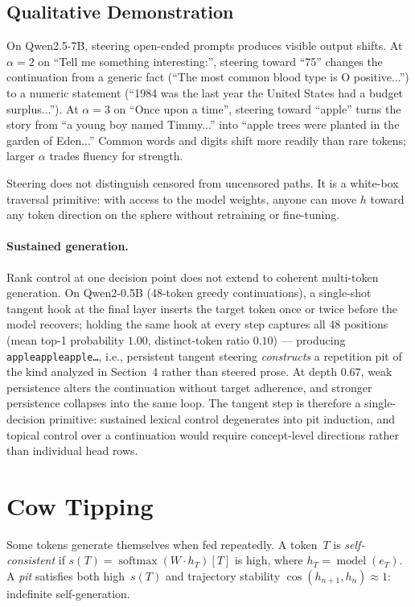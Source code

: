 \documentclass{article}
\begin{document}
\subsection{Qualitative Demonstration}

On Qwen2.5-7B, steering open-ended prompts produces visible output shifts. At
$\alpha=2$ on ``Tell me something interesting:'', steering toward ``75'' changes
the continuation from a generic fact (``The most common blood type is O
positive...'') to a numeric statement (``1984 was the last year the United
States had a budget surplus...''). At $\alpha=3$ on ``Once upon a time'',
steering toward ``apple'' turns the story from ``a young boy named Timmy...''
into ``apple trees were planted in the garden of Eden...'' Common words and
digits shift more readily than rare tokens; larger $\alpha$ trades fluency for
strength.

Steering does not distinguish censored from uncensored paths. It is a
white-box traversal primitive: with access to the model weights, anyone can move
$h$ toward any token direction on the sphere without retraining or fine-tuning.

\paragraph{Sustained generation.} Rank control at one decision point does not
extend to coherent multi-token generation. On Qwen2-0.5B (48-token greedy
continuations), a single-shot tangent hook at the final layer inserts the
target token once or twice before the model recovers; holding the same hook at
every step captures all 48 positions (mean top-1 probability $1.00$,
distinct-token ratio $0.10$) --- producing \texttt{appleappleapple\dots},
i.e., persistent tangent steering \emph{constructs} a repetition pit of the
kind analyzed in Section~4 rather than steered prose. At depth $0.67$, weak
persistence alters the continuation without target adherence, and stronger
persistence collapses into the same loop. The tangent step is therefore a
single-decision primitive: sustained lexical control degenerates into pit
induction, and topical control over a continuation would require
concept-level directions rather than individual head rows.

\section{Cow Tipping}

Some tokens generate themselves when fed repeatedly. A token~$T$ is
\emph{self-consistent} if $s(T) = \operatorname{softmax}(W \cdot h_T)[T]$ is
high, where $h_T = \operatorname{model}(e_T)$. A \emph{pit} satisfies both
high~$s(T)$ and trajectory stability $\cos(h_{n+1}, h_n) \approx 1$:
indefinite self-generation.
\end{document}
